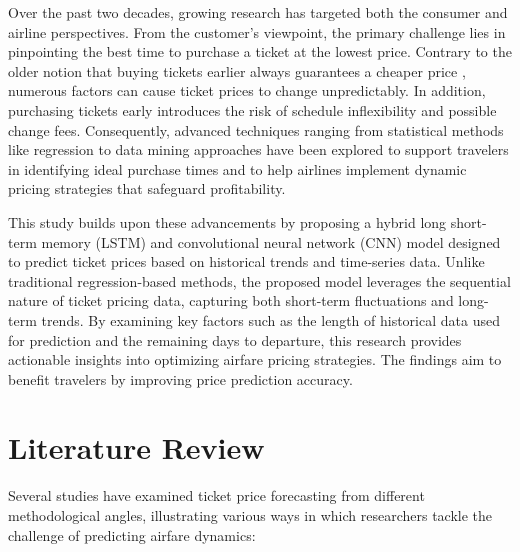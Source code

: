 \documentclass[conference]{IEEEtran}
\begin{document}
Over the past two decades, growing research has targeted both the consumer and airline perspectives. From the customer’s viewpoint, the primary challenge lies in pinpointing the best time to purchase a ticket at the lowest price. Contrary to the older notion that buying tickets earlier always guarantees a cheaper price \cite{b2}, numerous factors can cause ticket prices to change unpredictably. In addition, purchasing tickets early introduces the risk of schedule inflexibility and possible change fees. Consequently, advanced techniques ranging from statistical methods like regression to data mining approaches have been explored to support travelers in identifying ideal purchase times and to help airlines implement dynamic pricing strategies that safeguard profitability.

This study builds upon these advancements by proposing a hybrid long short-term memory (LSTM) and convolutional neural network (CNN)  model designed to predict ticket prices based on historical trends and time-series data. Unlike traditional regression-based methods, the proposed model leverages the sequential nature of ticket pricing data, capturing both short-term fluctuations and long-term trends. By examining key factors such as the length of historical data used for prediction and the remaining days to departure, this research provides actionable insights into optimizing airfare pricing strategies. The findings aim to benefit travelers by improving price prediction accuracy.


\section{Literature Review}
Several studies have examined ticket price forecasting from different methodological angles, illustrating various ways in which researchers tackle the challenge of predicting airfare dynamics:
\end{document}
